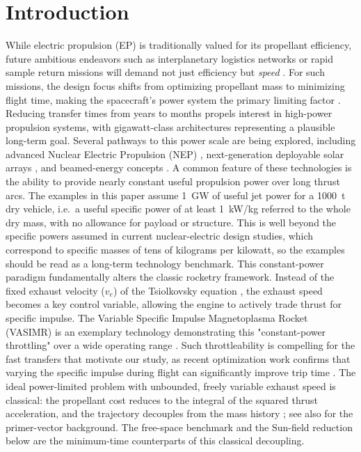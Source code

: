 \documentclass[journal,a4paper]{IEEEtran}
\begin{document}


\section{Introduction}
While electric propulsion (EP) is traditionally valued for its propellant efficiency, future ambitious endeavors such as interplanetary logistics networks or rapid sample return missions will demand not just efficiency but \emph{speed} \cite{Conway2010, PinoHowell2020, Fogel2020}. For such missions, the design focus shifts from optimizing propellant mass to minimizing flight time, making the spacecraft's power system the primary limiting factor \cite{Mazouffre2016}.
Reducing transfer times from years to months propels interest in high-power propulsion systems, with gigawatt-class architectures representing a plausible long-term goal. Several pathways to this power scale are being explored, including advanced Nuclear Electric Propulsion (NEP) \cite{Peakman2023, scott2019value}, next-generation deployable solar arrays \cite{ChangDiaz2019}, and beamed-energy concepts \cite{Sheerin2021}. A common feature of these technologies is the ability to provide nearly constant useful propulsion power over long thrust arcs. The examples in this paper assume \SI{1}{GW} of useful jet power for a \SI{1000}{t} dry vehicle, i.e.\ a useful specific power of at least \SI{1}{kW/kg} referred to the whole dry mass, with no allowance for payload or structure. This is well beyond the specific powers assumed in current nuclear-electric design studies, which correspond to specific masses of tens of kilograms per kilowatt, so the examples should be read as a long-term technology benchmark.
This constant-power paradigm fundamentally alters the classic rocketry framework. Instead of the fixed exhaust velocity ($v_e$) of the Tsiolkovsky equation \cite{Tsiolkovsky1903}, the exhaust speed becomes a key control variable, allowing the engine to actively trade thrust for specific impulse. The Variable Specific Impulse Magnetoplasma Rocket (VASIMR) is an exemplary technology demonstrating this "constant-power throttling" over a wide operating range \cite{Bering2011}. Such throttleability is compelling for the fast transfers that motivate our study, as recent optimization work confirms that varying the specific impulse during flight can significantly improve trip time \cite{DiPasquale2024}.
The ideal power-limited problem with unbounded, freely variable exhaust speed is classical: the propellant cost reduces to the integral of the squared thrust acceleration, and the trajectory decouples from the mass history \cite{Irving1959,MelbourneSauer1962,Grodzovskii1969,Marec1979}; see also \cite{Lawden1963} for the primer-vector background. The free-space benchmark and the Sun-field reduction below are the minimum-time counterparts of this classical decoupling.
\end{document}
